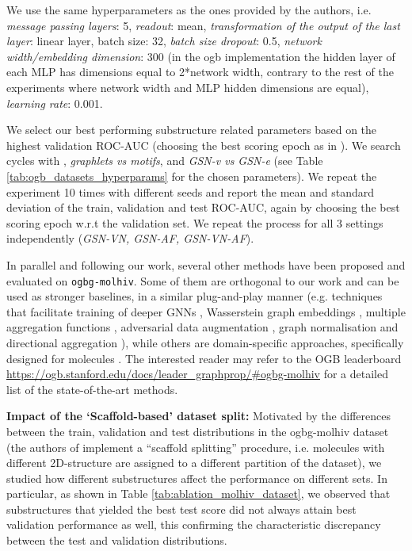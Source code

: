\documentclass{article} \usepackage{iclr2021_conference,times}
\begin{document}
We use the same hyperparameters as the ones provided by the authors, i.e. \textit{message passing layers}: 5, \textit{readout}: mean, \textit{transformation of the output of the last layer}: linear layer, batch size: 32, \textit{batch size
dropout}: 0.5, \textit{network width/embedding dimension}: 300 (in the ogb implementation the hidden layer of each MLP has dimensions equal to 2*network width, contrary to the rest of the experiments where network width and MLP hidden dimensions are equal), \textit{learning rate}: 0.001.

We select our best performing substructure related parameters based on the highest validation ROC-AUC (choosing the best scoring epoch as in \cite{DBLP:ogb}). We search cycles with , \textit{graphlets vs motifs}, and \textit{GSN-v vs GSN-e} (see Table \ref{tab:ogb_datasets_hyperparams} for the chosen parameters).  We repeat the experiment 10 times with different seeds and report the mean and standard deviation of the train, validation and test ROC-AUC, again by choosing the best scoring epoch w.r.t the validation set. We repeat the process for all 3 settings independently (\textit{GSN-VN, GSN-AF, GSN-VN-AF}).

In parallel and following our work, several other methods have been proposed and evaluated on \texttt{ogbg-molhiv}. Some of them are orthogonal to our work and can be used as stronger baselines, in a similar plug-and-play manner (e.g. techniques that facilitate training of deeper GNNs \citep{li2020deepergcn},  Wasserstein graph embeddings \citep{kolouri2020wasserstein}, multiple aggregation functions \citep{corso2020principal}, adversarial data augmentation \citep{kong2020flag}, graph normalisation \citep{cai2020graphnorm} and directional aggregation \citep{beaini2020directional}), while others are domain-specific approaches, specifically designed for molecules \citep{fey2020hierarchical, rogers2010extended}. The interested reader may refer to the OGB leaderboard \url{https://ogb.stanford.edu/docs/leader_graphprop/#ogbg-molhiv} for a detailed list of the state-of-the-art methods.

\noindent\textbf{Impact of the `Scaffold-based' dataset split:}
Motivated by the differences between the train, validation and test distributions in the ogbg-molhiv dataset (the authors of \cite{DBLP:ogb} implement a ``scaffold splitting'' procedure, i.e. molecules with different 2D-structure are assigned to a different partition of the dataset), we studied how different substructures affect the performance on different sets. In particular, as shown in Table \ref{tab:ablation_molhiv_dataset}, we observed that substructures that yielded the best test score did not always attain best validation performance as well, this confirming the characteristic discrepancy between the test and validation distributions. 
\end{document}
